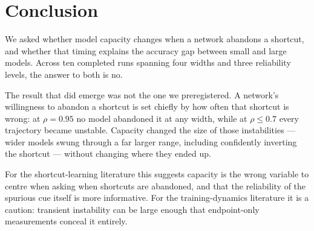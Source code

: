 \documentclass[conference]{IEEEtran}
\begin{document}
\section{Conclusion}

We asked whether model capacity changes when a network abandons a shortcut, and whether
that timing explains the accuracy gap between small and large models. Across ten completed
runs spanning four widths and three reliability levels, the answer to both is no.

The result that did emerge was not the one we preregistered. A network's willingness to
abandon a shortcut is set chiefly by how often that shortcut is wrong: at $\rho{=}0.95$ no
model abandoned it at any width, while at $\rho\le0.7$ every trajectory became unstable.
Capacity changed the size of those instabilities --- wider models swung through a far larger
range, including confidently inverting the shortcut --- without changing where they ended up.

For the shortcut-learning literature this suggests capacity is the wrong variable to centre
when asking when shortcuts are abandoned, and that the reliability of the spurious cue
itself is more informative. For the training-dynamics literature it is a caution:
transient instability can be large enough that endpoint-only measurements conceal it
entirely.
\end{document}
